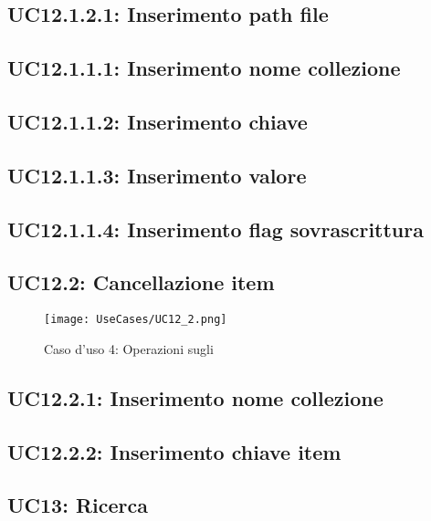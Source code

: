 \documentclass{scalatekids-article}
\begin{document}
\subsection{UC12.1.2.1: Inserimento path file}

\subsection{UC12.1.1.1: Inserimento nome collezione}

\subsection{UC12.1.1.2: Inserimento chiave}

\subsection{UC12.1.1.3: Inserimento valore}

\subsection{UC12.1.1.4: Inserimento flag sovrascrittura}

\subsection{UC12.2: Cancellazione item}

\begin{figure}[H]
  \begin{center}
    \texttt{[image: UseCases/UC12\_2.png]}
    \caption*{Caso d'uso 4: Operazioni sugli }
  \end{center}
\end{figure}

\subsection{UC12.2.1: Inserimento nome collezione}

\subsection{UC12.2.2: Inserimento chiave item}\fi

\subsection{UC13: Ricerca}
\end{document}
